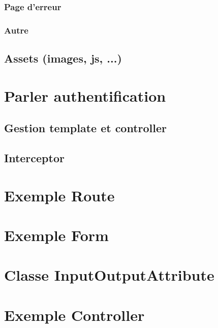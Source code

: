 
			\subsubsection{Page d'erreur}


			\subsubsection{Autre}


		\subsection{Assets (images, js, ...)}


	\section{Parler authentification}

		\subsection{Gestion template et controller}


		\subsection{Interceptor}


	\section{Exemple Route}


	\section{Exemple Form}


	\section{Classe InputOutputAttribute}


	\section{Exemple Controller}

